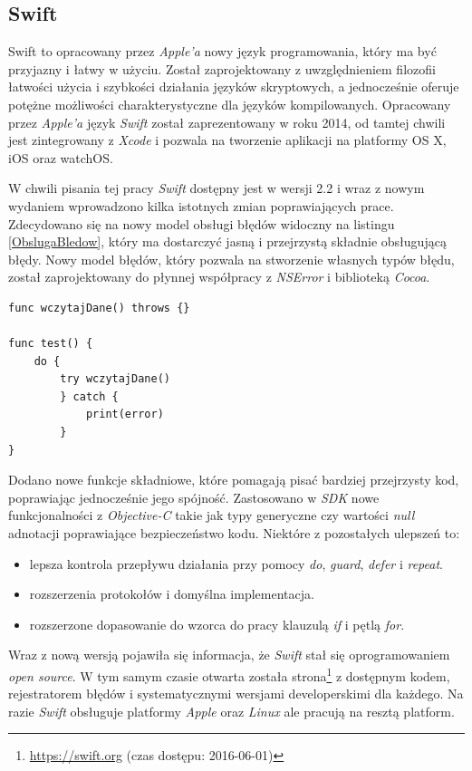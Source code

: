 \documentclass{iiuwb}
\begin{document}
\subsection{Swift}
Swift \cite{Lassoff:2014:Swift} to opracowany przez \textit{Apple'a} nowy język programowania, który ma być przyjazny i łatwy w użyciu. Został zaprojektowany z uwzględnieniem filozofii łatwości użycia i szybkości działania języków skryptowych, a jednocześnie oferuje potężne możliwości charakterystyczne dla języków kompilowanych.	 Opracowany przez \textit{Apple'a} język \textit{Swift} został zaprezentowany w roku 2014, od tamtej chwili jest zintegrowany z \textit{Xcode} i pozwala na tworzenie aplikacji na platformy OS X, iOS oraz watchOS. 

W chwili pisania tej pracy \textit{Swift} dostępny jest w wersji 2.2 i wraz z nowym wydaniem wprowadzono kilka istotnych zmian poprawiających prace. Zdecydowano się na nowy model obsługi błędów widoczny na listingu \ref{ObslugaBledow}, który ma dostarczyć jasną i przejrzystą składnie obsługującą błędy. Nowy model błędów, który pozwala na stworzenie własnych typów błędu, został zaprojektowany do płynnej współpracy z \textit{NSError} i biblioteką \textit{Cocoa}.
\begin{lstlisting}[label=ObslugaBledow, caption=Nowy model obsługi błedów w Swift]
func wczytajDane() throws {}

func test() {
	do {
		try wczytajDane()
		} catch {
			print(error)
		}
}
\end{lstlisting}
Dodano nowe funkcje składniowe, które pomagają pisać bardziej przejrzysty kod, poprawiając jednocześnie jego spójność. Zastosowano w \textit{SDK} nowe funkcjonalności z \textit{Objective-C} takie jak typy generyczne czy wartości \textit{null} adnotacji poprawiające bezpieczeństwo kodu. Niektóre z pozostałych ulepszeń to:
\begin{itemize}
\item lepsza kontrola przepływu działania przy pomocy \textit{do}, \textit{guard}, \textit{defer} i \textit{repeat}.    
\item rozszerzenia protokołów i domyślna implementacja.
\item rozszerzone dopasowanie do wzorca do pracy klauzulą \textit{if} i pętlą \textit{for}.
\end{itemize}
Wraz z nową wersją pojawiła się informacja, że \textit{Swift} stał się oprogramowaniem \textit{open source}. W tym samym czasie otwarta została strona\footnote{\url{https://swift.org} (czas dostępu: 2016-06-01)} z dostępnym kodem, rejestratorem błędów i systematycznymi wersjami developerskimi dla każdego. Na razie \textit{Swift} obsługuje platformy \textit{Apple} oraz \textit{Linux} ale pracują na resztą platform.
\end{document}
